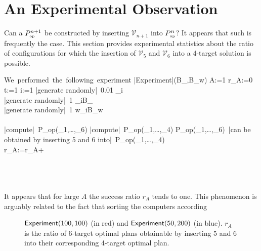 \documentclass[11pt]{llncs}
\begin{document}
\section{An Experimental Observation}

Can a $P_{\mbox{{\tiny op}}}^{n+1}$ be constructed by inserting $\mathcal{V}_{n+1}$ into $P_{\mbox{{\tiny op}}}^n$? It appears that such is frequently the case. This section provides experimental statistics about the ratio of configurations for which the insertion of $\mathcal{V}_5$ and $\mathcal{V}_6$ into a 4-target solution is possible.

\begin{program}
\mbox{We performed the following experiment}
\PROC |Experiment|(B_\pi,B_w) \BODY
  \FOR A:=1  \DO
   r_A:=0\\
    \FOR t:=1  \DO
    \FOR i:=1  \DO
       |generate randomly|~0.01 \leq \epsilon_i\\
       |generate randomly|~1 \leq \pi_i\leq B_\pi\\
       |generate randomly|~1 \leq w_i\leq B_w \\
    \OD\\
     |compute|~P_{\mbox{{\tiny op}}}(_1,\ldots,_6)
     |compute|~P_{\mbox{{\tiny op}}}(_1,\ldots,_4)
     \IF P_{\mbox{{\tiny op}}}(_1,\ldots,_6)~|can be obtained by inserting 5 and 6 into|~P_{\mbox{{\tiny op}}}(_1,\ldots,_4)\\
     \THEN r_A:=r_A+\\
     \FI\\
     \OD\\
     \OD\\
\end{program}

It appears that for large $A$ the success ratio $r_A$ tends to one. This phenomenon is arguably related to the fact that sorting the computers according %

\begin{figure}[!h]
\begin{center}
\end{center}
\caption{$\mbox{{\sf Experiment}}(100,100)$ (in red) and $\mbox{{\sf Experiment}}(50,200)$ (in blue). $r_A$ is the ratio of 6-target optimal plans obtainable by inserting 5 and 6 into their corresponding 4-target optimal plan.}
\label{fig}
\end{figure}
\end{document}
